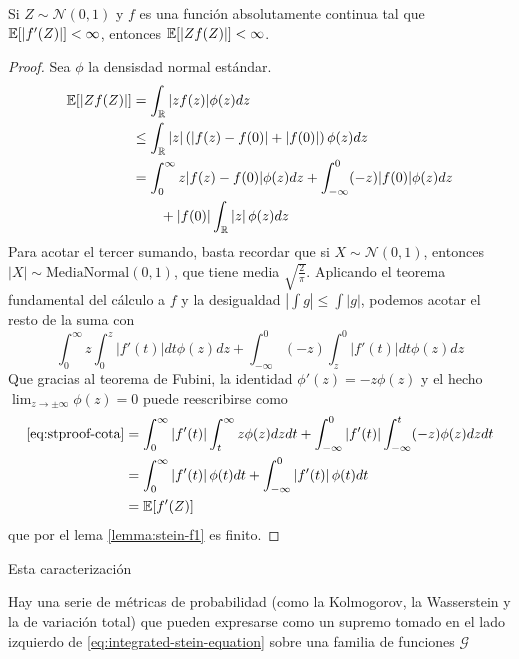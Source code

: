 \documentclass[main.tex]{subfiles}
\begin{document}
\begin{lemma}\label{lemma:stein-f2}
    Si $Z\sim \mathcal{N}(0, 1)$ y $f$ es una función absolutamente continua tal que $\operatorname{\mathbb{E}}[|f'(Z)|] < \infty$, entonces $\operatorname{\mathbb{E}}[|Zf(Z)|] < \infty$.
    \begin{proof}
        Sea $\phi$ la densisdad normal estándar.
        \begin{align*}
            \operatorname{\mathbb{E}}[|Zf(Z)|] &= \int_{\operatorname{\mathbb{R}}} |zf(z)|\phi(z)dz \\
            &\leq \int_{\operatorname{\mathbb{R}}}|z|\left(\left|f(z)-f(0)\right|+\left|f(0)\right|\right)\phi(z) dz \\
            &= \int_0^\infty z|f(z)-f(0)|\phi(z)dz + \int_{-\infty}^0(-z)|f(0)|\phi(z)dz \\
                &\qquad  + |f(0)|\int_{\operatorname{\mathbb{R}}}\left|z\right|\phi(z)dz
        \end{align*}
        Para acotar el tercer sumando, basta recordar que si $X\sim \mathcal{N}(0, 1)$, entonces $\left|X\right| \sim \text{MediaNormal}(0,1)$, que tiene media $\sqrt{\frac{2}{\pi}}$. Aplicando el teorema fundamental del cálculo a $f$ y la desigualdad $\left|\int g\right|\leq \int\left|g\right|$, podemos acotar el resto de la suma con
        \begin{equation}\label{eq:stproof-cota}
            \int_0^\infty z\int_0^z\left|f'(t)\right|dt\phi(z)dz 
                + \int_{-\infty}^0(-z)\int_z^0\left|f'(t)\right|dt\phi(z)dz
        \end{equation}
        Que gracias al teorema de Fubini, la identidad $\phi'(z) = -z\phi(z)$ y el hecho $\lim_{z\rightarrow \pm\infty}\phi(z) = 0$ puede reescribirse como
        \begin{align*}
            \eqref{eq:stproof-cota} &= \int_0^\infty \left|f'(t)\right|\int_t^\infty z\phi(z)dzdt
                + \int_{-\infty}^0\left|f'(t)\right|\int_{-\infty}^t(-z)\phi(z)dzdt \\
            &= \int_0^\infty \left|f'(t)\right|\phi(t)dt 
                + \int_{-\infty}^0 \left|f'(t)\right|\phi(t)dt \\
            &= \operatorname{\mathbb{E}}[f'(Z)]
        \end{align*}
        que por el lema \eqref{lemma:stein-f1} es finito.
    \end{proof}
\end{lemma}

Esta caracterización 

Hay una serie de métricas de probabilidad (como la Kolmogorov, la Wasserstein y la de variación total) que pueden expresarse como un supremo tomado en el lado izquierdo de \eqref{eq:integrated-stein-equation} sobre una familia de funciones $\mathcal{G}$ \cite{probability-metrics}
\end{document}
